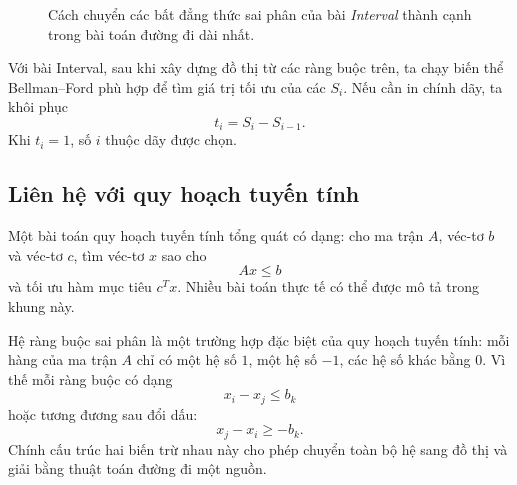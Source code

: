 \documentclass[11pt]{article}
\begin{document}
\begin{figure}[ht]
\centering
{}
\caption{Cách chuyển các bất đẳng thức sai phân của bài \textit{Interval}
thành cạnh trong bài toán đường đi dài nhất.}
\end{figure}

Với bài Interval, sau khi xây dựng đồ thị từ các ràng buộc trên, ta chạy biến
thể Bellman--Ford phù hợp để tìm giá trị tối ưu của các \(S_i\). Nếu cần in
chính dãy, ta khôi phục
\[
  t_i=S_i-S_{i-1}.
\]
Khi \(t_i=1\), số \(i\) thuộc dãy được chọn.

\subsection{Liên hệ với quy hoạch tuyến tính}

Một bài toán quy hoạch tuyến tính tổng quát có dạng: cho ma trận \(A\), véc-tơ
\(b\) và véc-tơ \(c\), tìm véc-tơ \(x\) sao cho
\[
  Ax\le b
\]
và tối ưu hàm mục tiêu \(c^T x\). Nhiều bài toán thực tế có thể được mô tả
trong khung này.

Hệ ràng buộc sai phân là một trường hợp đặc biệt của quy hoạch tuyến tính:
mỗi hàng của ma trận \(A\) chỉ có một hệ số \(1\), một hệ số \(-1\), các hệ số
khác bằng \(0\). Vì thế mỗi ràng buộc có dạng
\[
  x_i-x_j\le b_k
\]
hoặc tương đương sau đổi dấu:
\[
  x_j-x_i\ge -b_k.
\]
Chính cấu trúc hai biến trừ nhau này cho phép chuyển toàn bộ hệ sang đồ thị và
giải bằng thuật toán đường đi một nguồn.
\end{document}
